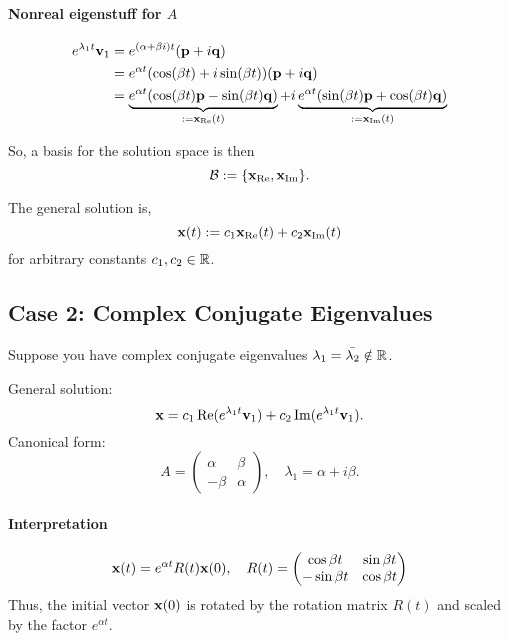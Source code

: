 \paragraph{Nonreal eigenstuff for \(A\)}
\begin{align*}
    e^{\lambda_1 t} \mathbf{v}_1 & = e^{(\alpha + \beta i)t} (\mathbf{p} + i \mathbf{q})                                                                                                                                               \\
                          & = e^{\alpha t} (\cos(\beta t) + i \sin(\beta t)) (\mathbf{p} + i \mathbf{q})                                                                                                                        \\
                          & = \underbrace{e^{\alpha t} (\cos(\beta t) \mathbf{p} - \sin(\beta t) \mathbf{q})}_{:= \mathbf{x}_{\Re}(t)} + i \underbrace{e^{\alpha t} (\sin(\beta t) \mathbf{p} + \cos(\beta t) \mathbf{q})}_{:= \mathbf{x}_{\Im}(t)}
\end{align*}

So, a basis for the solution space is then
\[\mathcal{B}:= \{\mathbf{x}_{\Re}, \mathbf{x}_{\Im}\}.\]

The general solution is,
\[\mathbf{x}(t) := c_1 \mathbf{x}_{\Re}(t) + c_2 \mathbf{x}_{\Im}(t)\]
for arbitrary constants \(c_1, c_2 \in \mathbb{R}\).

\subsection{Case 2: Complex Conjugate Eigenvalues}
Suppose you have complex conjugate eigenvalues \(\lambda_1 = \bar{\lambda_2} \notin \mathbb{R}\).

General solution:
\[\mathbf{x} = c_1 \Re(e^{\lambda_1 t}\mathbf{v}_1) + c_2 \Im(e^{\lambda_1 t}\mathbf{v}_1).\]
Canonical form:
\[A = \begin{pmatrix}
        \alpha & \beta  \\
        -\beta & \alpha
    \end{pmatrix}, \quad \lambda_1 = \alpha + i\beta.
\]

\paragraph{Interpretation}
\[\mathbf{x}(t) = e^{\alpha t}R(t)\mathbf{x}(0), \quad R(t) = \begin{pmatrix}
        \cos \beta t  & \sin \beta t \\
        -\sin \beta t & \cos \beta t
    \end{pmatrix}
\]
Thus, the initial vector \(\mathbf{x}(0)\) is rotated by the rotation matrix \(R(t)\) and scaled by the factor \(e^{\alpha t}\).

